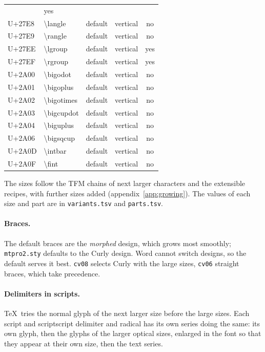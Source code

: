 \documentclass[10pt]{article}
\newcommand\file[1]{\texttt{#1}}
\newcommand\feat[1]{\texttt{#1}}
\begin{document}
\begin{longtable}{>{\ttfamily}l>{\ttfamily}lllc}
& yes \\
U+27E8 & \textbackslash{}langle & default & vertical & no \\
U+27E9 & \textbackslash{}rangle & default & vertical & no \\
U+27EE & \textbackslash{}lgroup & default & vertical & yes \\
U+27EF & \textbackslash{}rgroup & default & vertical & yes \\
U+2A00 & \textbackslash{}bigodot & default & vertical & no \\
U+2A01 & \textbackslash{}bigoplus & default & vertical & no \\
U+2A02 & \textbackslash{}bigotimes & default & vertical & no \\
U+2A03 & \textbackslash{}bigcupdot & default & vertical & no \\
U+2A04 & \textbackslash{}biguplus & default & vertical & no \\
U+2A06 & \textbackslash{}bigsqcup & default & vertical & no \\
U+2A0D & \textbackslash{}intbar & default & vertical & no \\
U+2A0F & \textbackslash{}fint & default & vertical & no \\
\bottomrule
\end{longtable}\endgroup

The sizes follow the TFM chains of next larger characters and the
extensible recipes, with further sizes added
(appendix~\ref{app:growing}).  The values of each size and part are in
\file{variants.tsv} and \file{parts.tsv}.

\paragraph{Braces.} The default braces are the \emph{morphed} design,
which grows most smoothly; \file{mtpro2.sty} defaults to the Curly
design.  Word cannot switch designs, so the default serves it best.
\feat{cv08} selects Curly with the large sizes, \feat{cv06} straight
braces, which take precedence.

\paragraph{Delimiters in scripts.} \TeX\ tries the normal glyph of the
next larger size before the large sizes.  Each script and scriptscript
delimiter and radical has its own series doing the same: its own glyph,
then the glyphs of the larger optical sizes, enlarged in the font so
that they appear at their own size, then the text series.
\end{document}
